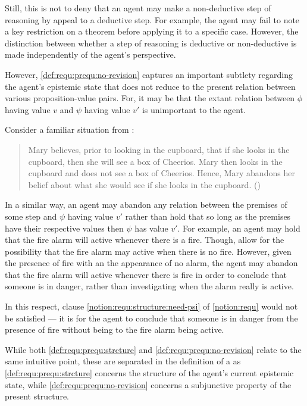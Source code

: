 \begin{note}[Weaker]
{    Still, this is not to deny that an agent may make a non-deductive step of reasoning by appeal to a deductive step.
    For example, the agent may fail to note a key restriction on a theorem before applying it to a specific case.
    However, the distinction between whether a step of reasoning is deductive or non-deductive is made independently of the agent's perspective.
  }
\end{note}


\begin{note}[\ref{def:requ:prequ:no-revision}]
  However, \ref{def:requ:prequ:no-revision} captures an important subtlety regarding the agent's epistemic state that does not reduce to the present relation between various proposition-value pairs.
  For, it may be that the extant relation between \(\phi\) having value \(v\) and \(\psi\) having value \(v'\) is unimportant to the agent.

  Consider a familiar situation from \citeauthor{Harman:1986ux}:

  \begin{quote}
    Mary believes, prior to looking in the cupboard, that if she looks in the cupboard, then she will see a box of Cheerios.
    Mary then looks in the cupboard and does not see a box of Cheerios.
    Hence, Mary abandons her belief about what she would see if she looks in the cupboard.\nolinebreak
    \mbox{}\hfill\mbox{(\citeyear[Cf.][Chs.1\&2]{Harman:1986ux})}
  \end{quote}

  In a similar way, an agent may abandon any relation between the premises of some step and \(\psi\) having value \(v'\) rather than hold that so long as the premises have their respective values then \(\psi\) has value \(v'\).
  For example, an agent may hold that the fire alarm will active whenever there is a fire.
  Though, allow for the possibility that the fire alarm may active when there is no fire.
  However, given the presence of fire with an the appearance of no alarm, the agent may abandon that the fire alarm will active whenever there is fire in order to conclude that someone is in danger, rather than investigating when the alarm really is active.

  In this respect, clause \ref{notion:requ:structure:need-psi} of \autoref{notion:requ} would not be satisfied --- it is \epVAd{} for the agent to conclude that someone is in danger from the presence of fire without being \committed{} to the fire alarm being active.

  While both \ref{def:requ:prequ:strcture} and \ref{def:requ:prequ:no-revision} relate to the same intuitive point, these are separated in the definition of a \prequ{} as \ref{def:requ:prequ:strcture} concerns the structure of the agent's current epistemic state, while \ref{def:requ:prequ:no-revision} concerns a subjunctive property of the present structure.
\end{note}

